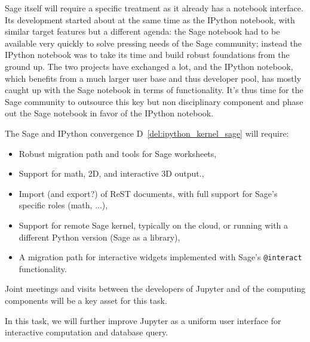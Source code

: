 \begin{workpackage}[id=UI,wphases=24-48,
  title=User Interfaces,
  PSRM=1,
  JURM=12, %
  LLRM=1, %
  SARM=1, %
  UKRM=1, %
  UBRM=1, %
  USORM=25]
\begin{tasklist}
\begin{task}[title=Uniform notebook interface for all interactive components]

  Sage itself will require a specific treatment as it already has a
  notebook interface. Its development started about at the same time
  as the IPython notebook, with similar target features but a
  different agenda: the Sage notebook had to be available very quickly
  to solve pressing needs of the Sage community; instead the IPython
  notebook was to take its time and build robust foundations from the
  ground up. The two projects have exchanged a lot, and the IPython
  notebook, which benefits from a much larger user base and thus
  developer pool, has mostly caught up with the Sage notebook in terms
  of functionality. It's thus time for the Sage community to outsource
  this key but non disciplinary component and phase out the Sage
  notebook in favor of the IPython notebook.

  The Sage and IPython convergence D~\ref{del:ipython_kernel_sage} will
  require:
  \begin{itemize}
  \item Robust migration path and tools for Sage worksheets,
  \item Support for math, 2D, and interactive 3D output.,
  \item Import (and export?) of ReST documents, with full support for
    Sage's specific roles (math, ...),
  \item Support for remote Sage kernel, typically on the cloud, or
    running with a different Python version (Sage as a library),
  \item A migration path for interactive widgets implemented with
    Sage's \texttt{@interact} functionality.
  \end{itemize}

  Joint meetings and visits between the developers of Jupyter and of
  the computing components will be a key asset for this task.

\end{task}

\begin{task}[title=Notebook interface usability]
  In this task, we will further improve Jupyter as a uniform user
  interface for interactive computation and database query.


\end{task}
\end{tasklist}
\end{workpackage}

